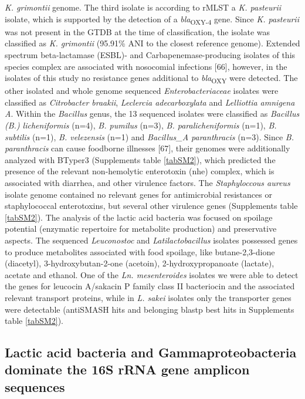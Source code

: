 \documentclass[preprint,3p,
a4paper]{elsarticle} %
\begin{document}
\emph{K. grimontii} genome. The third isolate is according to rMLST a
\emph{K. pasteurii} isolate, which is supported by the detection of a
\emph{bla}\textsubscript{OXY-4} gene. Since \emph{K. pasteurii} was not
present in the GTDB at the time of classification, the isolate was
classified as \emph{K. grimontii} (95.91\% ANI to the closest reference
genome). Extended spectrum beta-lactamase (ESBL)- and
Carbapenemase-producing isolates of this species complex are associated
with nosocomial infections {[}66{]}, however, in the isolates of this
study no resistance genes additional to \emph{bla}\textsubscript{OXY}
were detected. The other isolated and whole genome sequenced
\emph{Enterobacteriaceae} isolates were classified as \emph{Citrobacter
braakii}, \emph{Leclercia adecarboxylata} and \emph{Lelliottia amnigena
A}. Within the \emph{Bacillus} genus, the 13 sequenced isolates were
classified as \emph{Bacillus (B.) licheniformis} (n=4), \emph{B.
pumilus} (n=3), \emph{B. paralicheniformis} (n=1), \emph{B. subtilis}
(n=1), \emph{B. velezensis} (n=1) and \emph{Bacillus\_A paranthracis}
(n=3). Since \emph{B. paranthracis} can cause foodborne illnesses
{[}67{]}, their genomes were additionally analyzed with BTyper3
(Supplements table \ref{tabSM2}), which predicted the presence of the
relevant non-hemolytic enterotoxin (nhe) complex, which is associated
with diarrhea, and other virulence factors. The \emph{Staphyloccous
aureus} isolate genome contained no relevant genes for antimicrobial
resistances or staphylococcal enterotoxins, but several other virulence
genes (Supplements table \ref{tabSM2}). The analysis of the lactic acid
bacteria was focused on spoilage potential (enzymatic repertoire for
metabolite production) and preservative aspects. The sequenced
\emph{Leuconostoc} and \emph{Latilactobacillus} isolates possessed genes
to produce metabolites associated with food spoilage, like
butane-2,3-dione (diacetyl), 3-hydroxybutan-2-one (acetoin),
2-hydroxypropanoate (lactate), acetate and ethanol. One of the \emph{Ln.
mesenteroides} isolates we were able to detect the genes for leucocin
A/sakacin P family class II bacteriocin and the associated relevant
transport proteins, while in \emph{L. sakei} isolates only the
transporter genes were detectable (antiSMASH hits and belonging blastp
best hits in Supplements table \ref{tabSM2}).

\hypertarget{lactic-acid-bacteria-and-gammaproteobacteria-dominate-the-16s-rrna-gene-amplicon-sequences}{%
\subsection{Lactic acid bacteria and Gammaproteobacteria dominate the
16S rRNA gene amplicon
sequences}\label{lactic-acid-bacteria-and-gammaproteobacteria-dominate-the-16s-rrna-gene-amplicon-sequences}}
\end{document}
